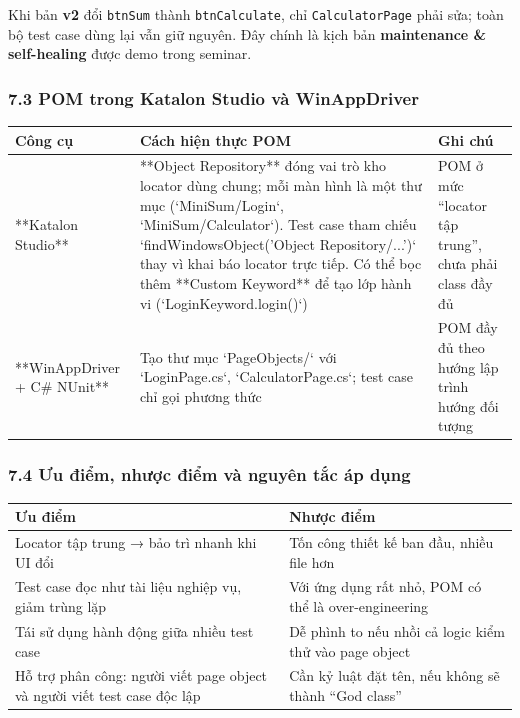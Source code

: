 Khi bản \textbf{v2} đổi \texttt{btnSum} thành \texttt{btnCalculate}, chỉ \texttt{CalculatorPage} phải sửa; toàn bộ test case dùng lại vẫn giữ nguyên. Đây chính là kịch bản \textbf{maintenance & self-healing} được demo trong seminar.

\subsubsection{7.3 POM trong Katalon Studio và WinAppDriver}

\begin{table}[H]
\centering
\begin{tabular}{|l|l|l|}
\hline
\textbf{Công cụ} & \textbf{Cách hiện thực POM} & \textbf{Ghi chú} \\ \hline
**Katalon Studio** & **Object Repository** đóng vai trò kho locator dùng chung; mỗi màn hình là một thư mục (`MiniSum/Login`, `MiniSum/Calculator`). Test case tham chiếu `findWindowsObject('Object Repository/...')` thay vì khai báo locator trực tiếp. Có thể bọc thêm **Custom Keyword** để tạo lớp hành vi (`LoginKeyword.login()`) & POM ở mức “locator tập trung”, chưa phải class đầy đủ \\ \hline
**WinAppDriver + C# NUnit** & Tạo thư mục `PageObjects/` với `LoginPage.cs`, `CalculatorPage.cs`; test case chỉ gọi phương thức & POM đầy đủ theo hướng lập trình hướng đối tượng \\ \hline
\end{tabular}
\end{table}




\subsubsection{7.4 Ưu điểm, nhược điểm và nguyên tắc áp dụng}

\begin{table}[H]
\centering
\begin{tabular}{|l|l|}
\hline
\textbf{Ưu điểm} & \textbf{Nhược điểm} \\ \hline
Locator tập trung → bảo trì nhanh khi UI đổi & Tốn công thiết kế ban đầu, nhiều file hơn \\ \hline
Test case đọc như tài liệu nghiệp vụ, giảm trùng lặp & Với ứng dụng rất nhỏ, POM có thể là over-engineering \\ \hline
Tái sử dụng hành động giữa nhiều test case & Dễ phình to nếu nhồi cả logic kiểm thử vào page object \\ \hline
Hỗ trợ phân công: người viết page object và người viết test case độc lập & Cần kỷ luật đặt tên, nếu không sẽ thành “God class” \\ \hline
\end{tabular}
\end{table}



